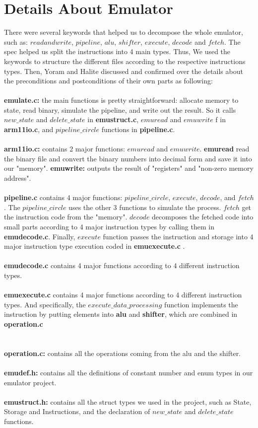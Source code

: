 \documentclass[a4paper]{article}
\begin{document}
\section{Details About Emulator}
There were several keywords that helped us to decompose the whole emulator, such as: $read and write$, $pipeline$, $alu$, $shifter$, $execute$, $decode$ and $fetch$. The spec helped us split the instructions into 4 main types. Thus, We used the keywords to structure the different files according to the respective instructions types. Then, Yoram and Halite discussed and confirmed over the details about the preconditions and postconditions of their own parts as following:
\\\\
\textbf{emulate.c:} the main functions is pretty straightforward: allocate memory to state, read binary, simulate the pipeline, and write out the result. So it calls $new\_state$ and $delete\_state$ in \textbf{emustruct.c}, $emuread$ and $emuwrite$ f in \textbf{arm11io.c}, and $pipeline\_circle$ functions in \textbf{pipeline.c}.
\\\\
\textbf{arm11io.c:} contains 2 major functions: $emuread$ and $emuwrite$. \textbf{emuread} read the binary file and convert the binary numbers into decimal form and save it into our "memory".
\textbf{emuwrite:} outputs the result of "registers" and "non-zero memory address".
\\\\
\textbf{pipeline.c} contains 4 major functions: $pipeline\_circle$, $execute$, $decode$, and $fetch$. The $pipeline\_circle$ uses the other 3 functions to simulate the process. $fetch$ get the instruction code from the "memory". $decode$ decomposes the fetched code into small parts according to 4 major instruction types by calling them in \textbf{emudecode.c}. Finally, $execute$ function passes the instruction and storage into 4 major instruction type execution coded in \textbf{emuexecute.c} .
\\\\
\textbf{emudecode.c} contains 4 major functions according to 4 different instruction types.
\\\\
\textbf{emuexecute.c} contains 4 major functions according to 4 different instruction types. And specifically, the $execute\_data\_processing$ function implements the instruction by putting elements into \textbf{alu} and \textbf{shifter}, which are combined in \textbf{operation.c}\\
\\\\
\textbf{operation.c:} contains all the operations coming from the alu and the shifter.
\\\\
\textbf{emudef.h:} contains all the definitions of constant number and enum types in our emulator project.
\\\\
\textbf{emustruct.h:} contains all the struct types we used in the project, such as State, Storage and Instructions, and the declaration of $new\_state$ and $delete\_state$ functions.
\end{document}
